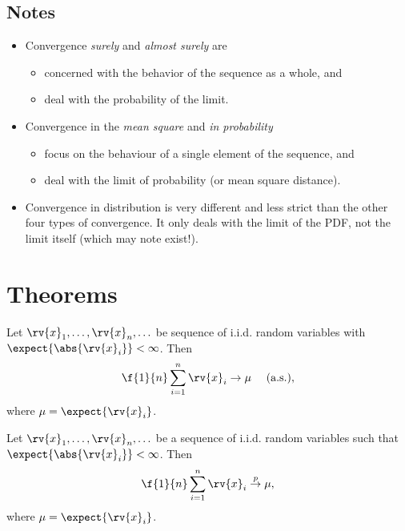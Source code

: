 \subsection*{Notes}
\begin{itemize}
    \item 
    Convergence \emph{surely} and \emph{almost surely} are
    \begin{itemize}
        \item concerned with the behavior of the sequence as a whole, and
        \item deal with the probability of the limit.
    \end{itemize}

    \item Convergence in the \emph{mean square} and \emph{in probability} 
    \begin{itemize}
        \item focus on the behaviour of a single element of the sequence, and
        \item deal with the limit of probability (or mean square distance).
    \end{itemize}

    \item Convergence in distribution is very different and less strict than the other four types of convergence. It only deals with the limit of the PDF, not the limit itself (which may note exist!).
\end{itemize}


\section{Theorems}
\begin{theoremBox}
   Let $\rv{x}_{1},\ldots,\rv{x}_{n}, \ldots$ be sequence of i.i.d. random variables with $\expect{\abs{\rv{x}_{i}}}<\infty$. Then
   \begin{align}
       \f{1}{n}\sum_{i=1}^{n} \rv{x}_{i} \to \mu \quad \text{ (a.s.)},
   \end{align}
   where $\mu = \expect{\rv{x}_{i}}$.    
\end{theoremBox}

\begin{theoremBox}
     Let $\rv{x}_{1}, \ldots, \rv{x}_{n}, \ldots$ be a sequence of i.i.d. random variables such that $\expect{\abs{\rv{x}_{i}}}<\infty$. Then
     \begin{align}
         \f{1}{n}\sum_{i=1}^{n}\rv{x}_{i} \overset{p}{\to}\mu,
     \end{align}
     where $\mu = \expect{\rv{x}_{i}}$.
\end{theoremBox}

